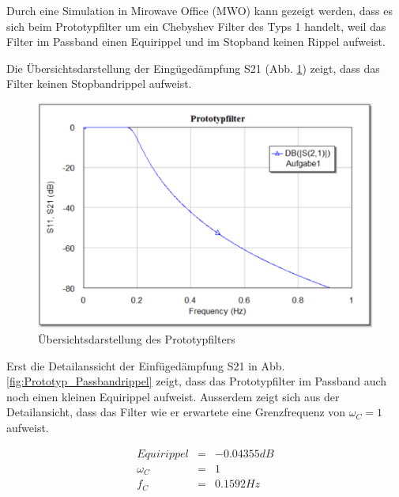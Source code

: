 Durch eine Simulation in Mirowave Office (MWO) kann gezeigt werden, dass es sich beim Prototypfilter um ein Chebyshev Filter des Typs 1 handelt, weil das Filter im Passband einen Equirippel und im Stopband keinen Rippel aufweist. 

Die Übersichtsdarstellung der Eingügedämpfung S21 (Abb. \ref{fig:Ovw_Prototyp}) zeigt, dass das Filter keinen Stopbandrippel aufweist.

\begin{figure}[h!]
\centering
 	\includegraphics[width=\imagewidth]{images/Ovw_Prototyp.png}
 	\caption{Übersichtsdarstellung des Prototypfilters}
 	\label{fig:Ovw_Prototyp}
\end{figure}

Erst die Detailanssicht der Einfügedämpfung S21 in Abb. \ref{fig:Prototyp_Passbandrippel} zeigt, dass das Prototypfilter im Passband auch noch einen kleinen Equirippel aufweist. Ausserdem zeigt sich aus der Detailansicht, dass das Filter wie er erwartete eine Grenzfrequenz von $\omega_C = 1$ aufweist.

\begin{mdframed}
\begin{equation*} 
\begin{array}{rclcl} 
Equirippel & = & -0.04355 dB \\ 
\omega_C & = & 1 \\ 
f_C & = & 0.1592 Hz \\ 
\end{array} 
\end{equation*} 
\end{mdframed}

